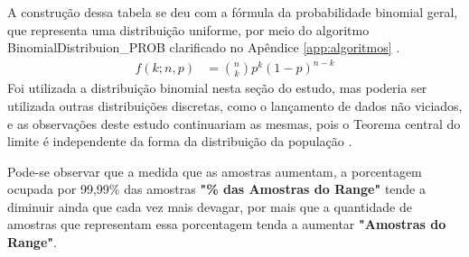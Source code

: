 A construção dessa tabela se deu com a fórmula da probabilidade binomial geral, que representa uma distribuição uniforme, por meio do algoritmo BinomialDistribuion\_PROB clarificado no Apêndice \ref{app:algoritmos} \cite{mathisfun_binomial_distribution}.
\begin{align*}
f(k;n,p) &= \binom{n}{k} p^k(1 - p)^{n-k}
\end{align*}
Foi utilizada a distribuição binomial nesta seção do estudo, mas poderia ser utilizada outras distribuições discretas, como o lançamento de dados não viciados, e as observações deste estudo continuariam as mesmas, pois o Teorema central do limite é independente da forma da distribuição da população \cite{statisticsbyjim_central_limite_theorem_explainded}.

Pode-se observar que a medida que as amostras aumentam, a porcentagem ocupada por 99,99\% das amostras \textbf{"\% das Amostras do Range"} tende a diminuir ainda que cada vez mais devagar, por mais que a quantidade de amostras que representam essa porcentagem tenda a aumentar \textbf{"Amostras do Range"}.

